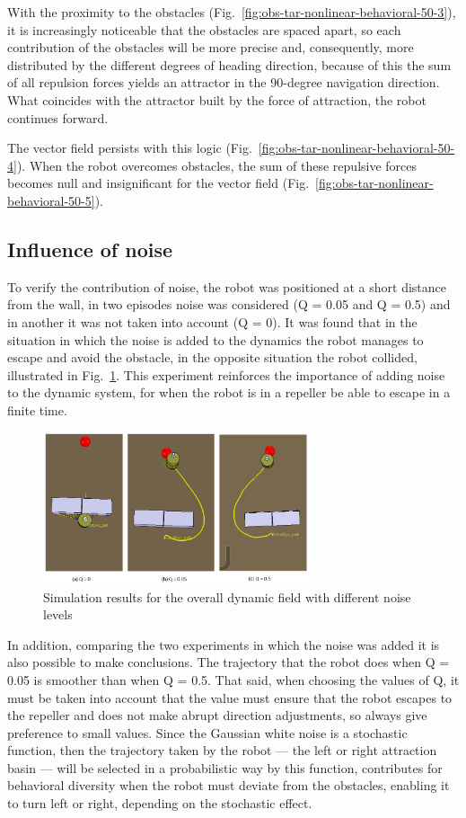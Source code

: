 With the proximity to the obstacles (Fig.~\ref{fig:obs-tar-nonlinear-behavioral-50-3}), it is increasingly noticeable that the
obstacles are spaced apart, so each contribution of the obstacles will be more
precise and, consequently, more distributed by the different degrees of heading
direction, because of this the sum of all
repulsion forces yields an attractor in the 90-degree navigation
direction. What coincides with the attractor built by the force of attraction,
the robot continues forward.

The vector field persists with this logic (Fig.~\ref{fig:obs-tar-nonlinear-behavioral-50-4}). When the robot overcomes
obstacles, the sum of these repulsive forces becomes null and insignificant for
the vector field (Fig.~\ref{fig:obs-tar-nonlinear-behavioral-50-5}).

\subsection{Influence of noise}%
\label{sec:obs-tar-nonlinear-noise}
To verify the contribution of noise, the robot was positioned at a short distance from the wall, in two episodes noise was considered (Q = 0.05 and Q = 0.5) and in another it was not taken into account (Q = 0).
It was found that in the situation in which the noise is added to the dynamics the robot manages to escape and avoid the obstacle, in the opposite situation the robot collided, illustrated in Fig.~\ref{fig:obs-tar-nonlinear-noise}.
This experiment reinforces the importance of adding noise to the dynamic system,
for when the robot is in a repeller be able to escape in a finite time. 
%
\begin{figure}[htb!]
  \centering
  \includegraphics[width=0.7\textwidth]{img/obs-tar-nonlinear-noise.PNG}
  \caption{Simulation results for the overall dynamic field with different noise levels}%
  \label{fig:obs-tar-nonlinear-noise}
\end{figure}
%

In addition, comparing the two experiments in which the noise was added it is also possible to make conclusions. The trajectory that the robot does when Q = 0.05 is smoother than when Q = 0.5. 
That said, when choosing the values of Q, it must be taken into account that the value must ensure that the robot escapes to the repeller and does not make abrupt direction adjustments, so always give preference to small values.
Since the Gaussian white noise is a stochastic function, then the trajectory
taken by the robot --- the left or right attraction basin --- will be selected
in a probabilistic way by this function, contributes for behavioral diversity
when the robot must deviate from the obstacles, enabling it to turn left or right,
depending on the stochastic effect. 
%
